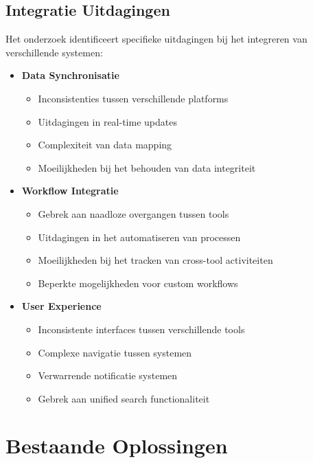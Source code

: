\subsection{Integratie Uitdagingen}
\label{subsec:integratie}

Het \textcite{StackOverflow2023} onderzoek identificeert specifieke uitdagingen bij het integreren van verschillende systemen:

\begin{itemize}
    \item \textbf{Data Synchronisatie}
    \begin{itemize}
        \item Inconsistenties tussen verschillende platforms
        \item Uitdagingen in real-time updates
        \item Complexiteit van data mapping
        \item Moeilijkheden bij het behouden van data integriteit
    \end{itemize}
    
    \item \textbf{Workflow Integratie}
    \begin{itemize}
        \item Gebrek aan naadloze overgangen tussen tools
        \item Uitdagingen in het automatiseren van processen
        \item Moeilijkheden bij het tracken van cross-tool activiteiten
        \item Beperkte mogelijkheden voor custom workflows
    \end{itemize}
    
    \item \textbf{User Experience}
    \begin{itemize}
        \item Inconsistente interfaces tussen verschillende tools
        \item Complexe navigatie tussen systemen
        \item Verwarrende notificatie systemen
        \item Gebrek aan unified search functionaliteit
    \end{itemize}
\end{itemize}

\section{Bestaande Oplossingen}
\label{sec:bestaande-oplossingen}

